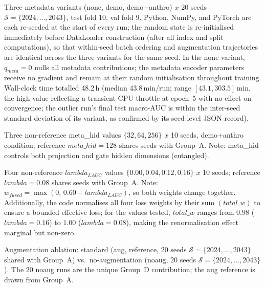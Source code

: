 \documentclass[mathematics,article,pdftex]{Definitions/mdpi}
\def\texttt#1{#1}%
\def\mathrm#1{#1}%
\def\textbf#1{#1}%
\def\times{x}%
\def\lambda{lambda }%
\begin{document}
{\sloppy
\begin{description}[leftmargin=1.5em, style=sameline, font=\normalfont]
\item[\textbf{Group A} (primary confirmatory, 60 runs).] Three metadata variants (\texttt{none}, \texttt{demo}, \texttt{demo+anthro}) $\times$ \textbf{20 seeds} $\mathcal{S}{=}\{2024,\ldots,2043\}$, test fold 10, val fold 9. Python, NumPy, and PyTorch are each re-seeded at the start of every run; the random state is re-initialised immediately before \texttt{DataLoader} construction (after all index and split computations), so that within-seed batch ordering and augmentation trajectories are identical across the three variants for the same seed. In the \texttt{none} variant, $q_{\mathrm{meta}}{=}0$ nulls all metadata contributions; the metadata encoder parameters receive no gradient and remain at their random initialisation throughout training. Wall-clock time totalled 48.2\,h (median 43.8\,min/run; range $[43.1, 303.5]$\,min, the high value reflecting a transient CPU throttle at epoch~5 with no effect on convergence; the outlier run's final test macro-AUC is within the inter-seed standard deviation of its variant, as confirmed by its seed-level JSON record).
\item[\textbf{Group B} (exploratory, 30 unique runs).] Three non-reference \texttt{meta\_hid} values $\{32,64,256\}$ $\times$ 10 seeds, \texttt{demo+anthro} condition; reference $\texttt{meta\_hid}{=}128$ shares seeds with Group~A. Note: \texttt{meta\_hid} controls both projection and gate hidden dimensions (entangled).
\item[\textbf{Group C} (exploratory, 40 unique runs).] Four non-reference $\lambda_{\mathrm{LAUC}}$ values $\{0.00,0.04,0.12,0.16\}$ $\times$ 10 seeds; reference $\lambda{=}0.08$ shares seeds with Group~A. Note: $w_{\mathrm{fused}}{=}\max(0,\,0.60{-}\lambda_{\mathrm{LAUC}})$, so both weights change together. Additionally, the code normalises all four loss weights by their sum $(\texttt{total\_w})$ to ensure a bounded effective loss; for the values tested, $\texttt{total\_w}$ ranges from $0.98$ ($\lambda{=}0.16$) to $1.00$ ($\lambda{=}0.08$), making the renormalisation effect marginal but non-zero.
\item[\textbf{Group D} (exploratory, 20 unique runs).] Augmentation ablation: standard (\texttt{aug}, reference, 20 seeds $\mathcal{S}{=}\{2024,\ldots,2043\}$ shared with Group~A) vs.\ no-augmentation (\texttt{noaug}, 20 seeds $\mathcal{S}{=}\{2024,\ldots,2043\}$). The 20 noaug runs are the unique Group~D contribution; the aug reference is drawn from Group~A.

\end{description}}
\end{document}
